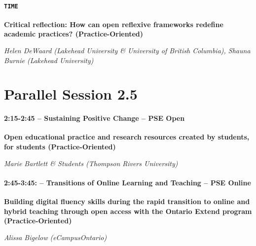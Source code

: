 \documentclass[
]{book}
\begin{document}
\begin{secondary}
\hypertarget{time}{%
\paragraph{\texorpdfstring{\texttt{TIME}}{TIME}}\label{time}}

\textbf{Critical reflection: How can open reflexive frameworks redefine
academic practices? (Practice-Oriented)}

\emph{Helen DeWaard (Lakehead University \& University of British
Columbia), Shauna Burnie (Lakehead University)}
\end{secondary}

\hypertarget{parallel-session-2.5}{%
\section*{Parallel Session 2.5}\label{parallel-session-2.5}}

\begin{secondary}
\hypertarget{sustaining-positive-change-pse-open}{%
\paragraph*{2:15-2:45 -- Sustaining Positive Change -- PSE
Open}\label{sustaining-positive-change-pse-open}}

\textbf{Open educational practice and research resources created by
students, for students (Practice-Oriented)}

\emph{Marie Bartlett \& Students (Thompson Rivers University)}
\end{secondary}

\begin{secondary}
\hypertarget{transitions-of-online-learning-and-teaching-pse-online}{%
\paragraph*{2:45-3:45: -- Transitions of Online Learning and Teaching --
PSE
Online}\label{transitions-of-online-learning-and-teaching-pse-online}}

\textbf{Building digital fluency skills during the rapid transition to
online and hybrid teaching through open access with the Ontario Extend
program (Practice-Oriented)}

\emph{Alissa Bigelow (eCampusOntario)}
\end{secondary}
\end{document}
